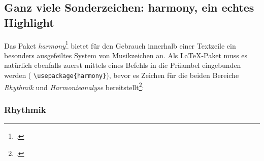 %
%
%




\subsection{Ganz viele Sonderzeichen: harmony, ein echtes Highlight }

Das Paket \textit{harmony}\footcite[vgl.][\nopage wp]{CtanHarmony2018a} bietet für
den Gebrauch innerhalb einer Textzeile ein besonders ausgefeiltes System von
Musikzeichen an. Als \LaTeX-Paket muss es natürlich ebenfalls zuerst mittels
eines Befehls in die Präambel eingebunden werden (\small 
\texttt{\textbackslash{usepackage\{harmony\}}}), bevor es Zeichen für die beiden
Bereiche \textit{Rhythmik} und \textit{Harmonieanalyse} bereitstellt\footcite[Für
einen vollen Überblick über den Zeichenvorrat und die Kombinationsmöglichkeiten
vgl.][4ff]{WegWeg2007a}:

\subsubsection{\small Rhythmik}


